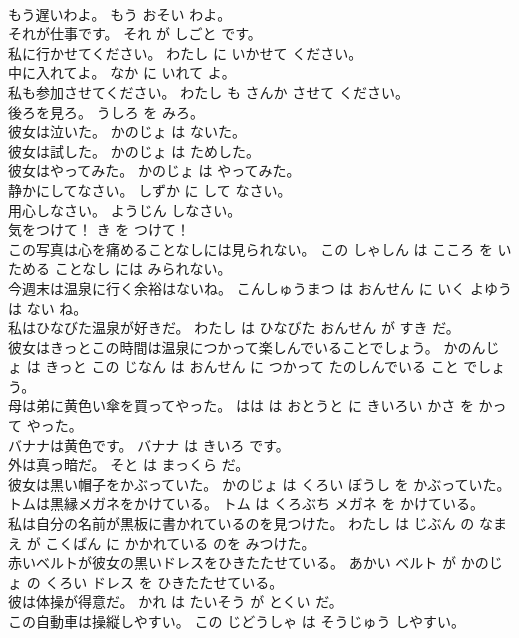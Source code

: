 \documentclass[8pt]{extreport}
\begin{document}
\begin{CJK}{UTF8}{min}
\\	もう遅いわよ。	もう おそい わよ。	
\\	それが仕事です。	それ が しごと です。	
\\	私に行かせてください。	わたし に いかせて ください。	
\\	中に入れてよ。	なか に いれて よ。	
\\	私も参加させてください。	わたし も さんか させて ください。	
\\	後ろを見ろ。	うしろ を みろ。	
\\	彼女は泣いた。	かのじょ は ないた。	
\\	彼女は試した。	かのじょ は ためした。	
\\	彼女はやってみた。	かのじょ は やってみた。	
\\	静かにしてなさい。	しずか に して なさい。	
\\	用心しなさい。	ようじん しなさい。	
\\	気をつけて！	き を つけて！	
\\	この写真は心を痛めることなしには見られない。	この しゃしん は こころ を いためる ことなし には みられない。	
\\	今週末は温泉に行く余裕はないね。	こんしゅうまつ は おんせん に いく よゆう は ない ね。	
\\	私はひなびた温泉が好きだ。	わたし は ひなびた おんせん が すき だ。	
\\	彼女はきっとこの時間は温泉につかって楽しんでいることでしょう。	かのんじょ は きっと この じなん は おんせん に つかって たのしんでいる こと でしょう。	
\\	母は弟に黄色い傘を買ってやった。	はは は おとうと に きいろい かさ を かって やった。	
\\	バナナは黄色です。	バナナ は きいろ です。	
\\	外は真っ暗だ。	そと は まっくら だ。	
\\	彼女は黒い帽子をかぶっていた。	かのじょ は くろい ぼうし を かぶっていた。	
\\	トムは黒縁メガネをかけている。	トム は くろぶち メガネ を かけている。	
\\	私は自分の名前が黒板に書かれているのを見つけた。	わたし は じぶん の なまえ が こくばん に かかれている のを みつけた。	
\\	赤いベルトが彼女の黒いドレスをひきたたせている。	あかい ベルト が かのじょ の くろい ドレス を ひきたたせている。	
\\	彼は体操が得意だ。	かれ は たいそう が とくい だ。	
\\	この自動車は操縦しやすい。	この じどうしゃ は そうじゅう しやすい。	

\end{CJK}
\end{document}
